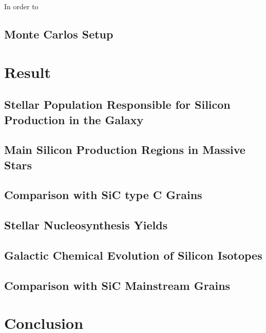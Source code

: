 \documentclass{brandeis-thesis3.2}
\begin{document}
In order to 

\section{Monte Carlos Setup}

\chapter{Result} \label{result}

\section{Stellar Population Responsible for Silicon Production in the Galaxy}
\section{Main Silicon Production Regions in Massive Stars}

\section{Comparison with SiC type C Grains}


\section{Stellar Nucleosynthesis Yields}

\section{Galactic Chemical Evolution of Silicon Isotopes}

\section{Comparison with SiC Mainstream Grains}

\chapter{Conclusion} \label{conclusion}


\singlespacing

\end{document}
